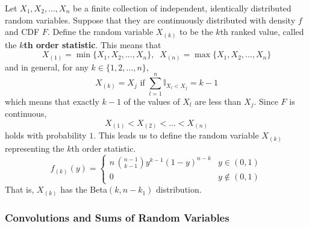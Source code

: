     \begin{definition}
      Let $X_1, X_2, ..., X_n$ be a finite collection of independent, identically distributed random variables. Suppose that they are continuously distributed with density $f$ and CDF $F$. Define the random variable $X_{(k)}$ to be the $k$th ranked value, called the \textbf{$k$th order statistic}. This means that 
      \begin{equation}
        X_{(1)} = \min\{X_1, X_2, ..., X_n\}, \;\; X_{(n)} = \max\{X_1, X_2, ..., X_n\}
      \end{equation}
      and in general, for any $k \in \{1, 2, ..., n\}$, 
      \begin{equation}
        X_{(k)} = X_j \text{ if } \sum_{l=1}^n \mathbb{I}_{X_l < X_j} = k - 1
      \end{equation}
      which means that exactly $k-1$ of the values of $X_l$ are less than $X_j$. Since $F$ is continuous, 
      \begin{equation}
        X_{(1)} < X_{(2)} < ... < X_{(n)}
      \end{equation}
      holds with probability $1$. This leads us to define the random variable $X_{(k)}$ representing the $k$th order statistic.
      \begin{equation}
        f_{(k)} (y) = \begin{cases} 
        n \, \binom{n-1}{k-1} y^{k-1} (1-y)^{n-k} & y \in (0, 1) \\
        0 & y \not\in (0,1)
        \end{cases}
      \end{equation}
      That is, $X_{(k)}$ has the Beta$(k, n-k_1)$ distribution. 
    \end{definition}

  \subsubsection{Convolutions and Sums of Random Variables}

